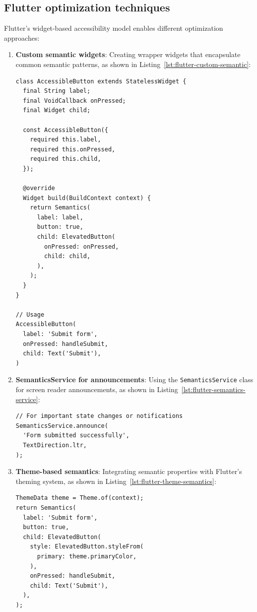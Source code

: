 \subsection{Flutter optimization techniques}
\label{subsec:flutter-optimization}

Flutter's widget-based accessibility model enables different optimization approaches:

\begin{enumerate}
    \item \textbf{Custom semantic widgets}: Creating wrapper widgets that encapsulate common semantic patterns, as shown in Listing~\ref{lst:flutter-custom-semantic}:
    
    \begin{lstlisting}[style=DartStyle, caption=Custom semantic widget in Flutter, label=lst:flutter-custom-semantic]
class AccessibleButton extends StatelessWidget {
  final String label;
  final VoidCallback onPressed;
  final Widget child;

  const AccessibleButton({
    required this.label,
    required this.onPressed,
    required this.child,
  });

  @override
  Widget build(BuildContext context) {
    return Semantics(
      label: label,
      button: true,
      child: ElevatedButton(
        onPressed: onPressed,
        child: child,
      ),
    );
  }
}

// Usage
AccessibleButton(
  label: 'Submit form',
  onPressed: handleSubmit,
  child: Text('Submit'),
)
    \end{lstlisting}

\pagebreak
    
    \item \textbf{SemanticsService for announcements}: Using the \texttt{SemanticsService} class for screen reader announcements, as shown in Listing~\ref{lst:flutter-semantics-service}:
    
    \begin{lstlisting}[style=DartStyle, caption=SemanticsService usage in Flutter, label=lst:flutter-semantics-service]
// For important state changes or notifications
SemanticsService.announce(
  'Form submitted successfully',
  TextDirection.ltr,
);
    \end{lstlisting}
    
    \item \textbf{Theme-based semantics}: Integrating semantic properties with Flutter's theming system, as shown in Listing~\ref{lst:flutter-theme-semantics}:
    
    \begin{lstlisting}[style=DartStyle, caption=Theme-based semantics in Flutter, label=lst:flutter-theme-semantics]
ThemeData theme = Theme.of(context);
return Semantics(
  label: 'Submit form',
  button: true,
  child: ElevatedButton(
    style: ElevatedButton.styleFrom(
      primary: theme.primaryColor,
    ),
    onPressed: handleSubmit,
    child: Text('Submit'),
  ),
);
    \end{lstlisting}
\end{enumerate}

